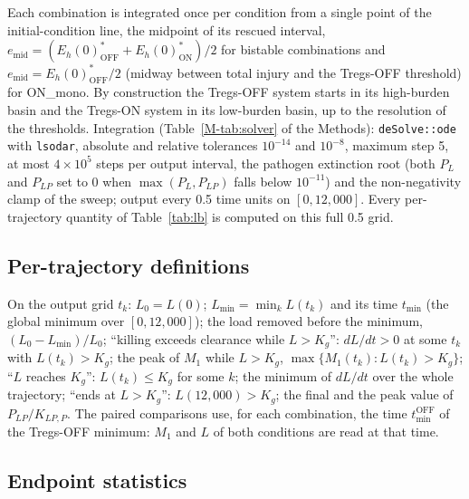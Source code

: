 \documentclass[11pt]{article}
\begin{document}
Each combination is integrated once per condition from a single point of the
initial-condition line, the midpoint of its rescued interval,
$e_{\mathrm{mid}} = (E_h(0)^*_{\mathrm{OFF}}+E_h(0)^*_{\mathrm{ON}})/2$ for bistable combinations
and $e_{\mathrm{mid}} = E_h(0)^*_{\mathrm{OFF}}/2$ (midway between total injury and the
Tregs-OFF threshold) for ON\_mono. By construction the Tregs-OFF system starts in its
high-burden basin and the Tregs-ON system in its low-burden basin, up to the resolution
of the thresholds. Integration (Table~\ref{M-tab:solver} of the Methods): \texttt{deSolve::ode} with \texttt{lsodar}, absolute and
relative tolerances $10^{-14}$ and $10^{-8}$, maximum step 5, at most $4\times10^{5}$ steps
per output interval, the pathogen extinction root (both $P_L$ and $P_{LP}$ set to 0 when
$\max(P_L,P_{LP})$ falls below $10^{-11}$) and the non-negativity clamp of the sweep;
output every 0.5 time units on $[0, 12{,}000]$. Every per-trajectory quantity of
Table~\ref{tab:lb} is computed on this full 0.5 grid.

\subsection{Per-trajectory definitions}

On the output grid $t_k$: $L_0 = L(0)$; $L_{\min} = \min_k L(t_k)$ and its time
$t_{\min}$ (the global minimum over $[0,12{,}000]$); the load removed before the minimum,
$(L_0 - L_{\min})/L_0$; ``killing exceeds clearance while $L>K_g$'': $dL/dt>0$ at some $t_k$
with $L(t_k) > K_g$; the peak of $M_1$ while $L>K_g$, $\max\{M_1(t_k): L(t_k)>K_g\}$;
``$L$ reaches $K_g$'': $L(t_k) \le K_g$ for some $k$; the minimum of $dL/dt$ over the whole
trajectory; ``ends at $L>K_g$'': $L(12{,}000)>K_g$; the final and the peak value of
$P_{LP}/K_{LP,P}$. The paired comparisons use, for each combination, the time
$t_{\min}^{\mathrm{OFF}}$ of the Tregs-OFF minimum: $M_1$ and $L$ of both conditions are read
at that time.

\subsection{Endpoint statistics}
\end{document}
